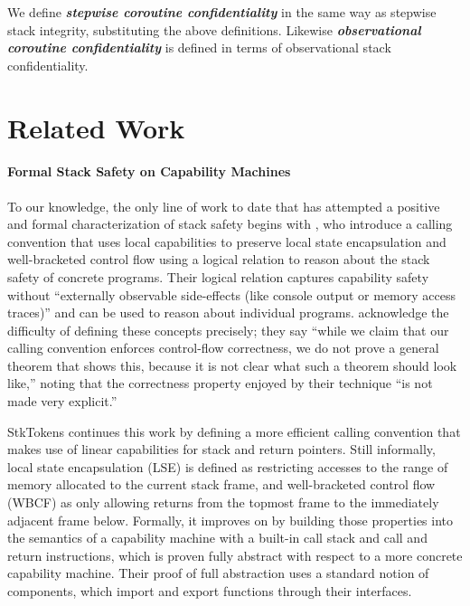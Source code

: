 \documentclass[acmsmall,review,anonymous]{acmart}\settopmatter{printfolios=true,printccs=false,printacmref=false}
\begin{document}
{
We define \textbf{\em stepwise coroutine confidentiality} in the same way as stepwise stack
integrity, substituting the above definitions. Likewise
\textbf{\em observational coroutine confidentiality} is defined in terms of observational
stack confidentiality.

\section{Related Work}
\label{sec:relwork}

\paragraph{Formal Stack Safety on Capability Machines}
%
To our knowledge, the only line of work to date that has attempted
a positive and formal characterization of
stack safety begins with \citet{SkorstengaardLocal}, who introduce a calling
convention that uses local capabilities to preserve local state
encapsulation and well-bracketed control flow
using a logical relation to reason about the stack safety of concrete
programs.
Their logical
relation captures capability safety without ``externally observable
side-effects (like console output or memory access traces)''
and can be used to reason about individual programs.
\citet{SkorstengaardLocal} acknowledge the difficulty of defining
these concepts precisely; they say
``while we claim that our calling
convention enforces control-flow correctness, we do not prove a
general theorem that shows this, because it is not clear what such a
theorem should look like,'' noting that the correctness property
enjoyed by their technique ``is not made very explicit.''

StkTokens \citep{SkorstengaardSTKJFP} continues this work by defining a more efficient
calling convention that makes use of linear capabilities for stack and return
pointers.
Still informally, local state encapsulation (LSE) is defined as
restricting accesses to the range of memory allocated to the current stack
frame, and well-bracketed control flow (WBCF) as only allowing returns from the topmost
frame to the immediately adjacent frame below. Formally, it improves on
\citet{SkorstengaardLocal} by building those properties into the semantics of a
capability machine with a built-in call stack and call and return instructions,
which is proven fully abstract with respect to a more concrete capability
machine.
Their proof of full abstraction uses a standard notion of components, which
import and export functions through their interfaces.

}
\end{document}
